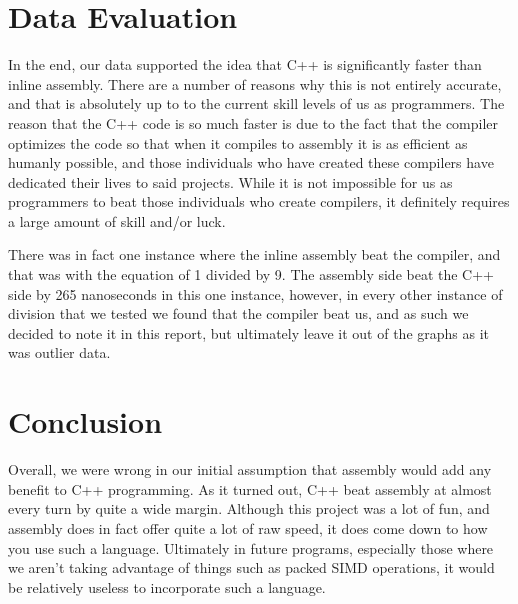 \documentclass[a4paper,10pt]{article}
\begin{document}
\section*{Data Evaluation}
\smallskip
In the end, our data supported the idea that C++ is significantly faster than inline assembly. There are a number of reasons why this is not entirely accurate, and that is absolutely up to to the current skill levels of us as programmers. The reason that the C++ code is so much faster is due to the fact that the compiler optimizes the code so that when it compiles to assembly it is as efficient as humanly possible, and those individuals who have created these compilers have dedicated their lives to said projects. While it is not impossible for us as programmers to beat those individuals who create compilers, it definitely requires a large amount of skill and/or luck. 

\smallskip
There was in fact one instance where the inline assembly beat the compiler, and that was with the equation of 1 divided by 9. The assembly side beat the C++ side by 265 nanoseconds in this one instance, however, in every other instance of division that we tested we found that the compiler beat us, and as such we decided to note it in this report, but ultimately leave it out of the graphs as it was outlier data. 

\section*{Conclusion}
\smallskip
Overall, we were wrong in our initial assumption that assembly would add any benefit to C++ programming. As it turned out, C++ beat assembly at almost every turn by quite a wide margin. Although this project was a lot of fun, and assembly does in fact offer quite a lot of raw speed, it does come down to how you use such a language. Ultimately in future programs, especially those where we aren't taking advantage of things such as packed SIMD operations, it would be relatively useless to incorporate such a language.
\end{document}
